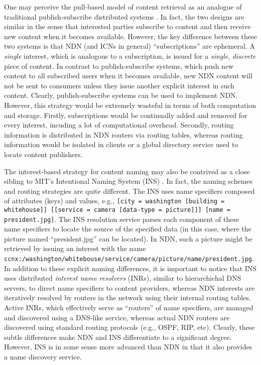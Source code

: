 One may perceive the pull-based model of content retrieval as an analogue of traditional publish-subscribe distributed systems \cite{eugster2003many}. In fact, the two designs are similar in the sense that interested parties subscribe to content and then receive new content when it becomes available. However, the key difference between these two systems is that NDN (and ICNs in general) ``subscriptions'' are ephemeral. A \emph{single} interest, which is analogous to a subscription, is issued for a \emph{single}, \emph{discrete} piece of content. In contrast to publish-subscribe systems, which push new content to all subscribed users when it becomes available, new NDN content will not be sent to consumers unless they issue another explicit interest in such content. Clearly, publish-subscribe systems can be used to implement NDN. However, this strategy would be extremely wasteful in terms of both computation and storage. Firstly, subscriptions would be continually added and removed for every interest, incuding a lot of computational overhead. Secondly, routing information is distributed in NDN routers via routing tables, whereas routing information would be isolated in clients or a global directory service used to locate content publishers. 

The interest-based strategy for content naming may also be contrived as a close sibling to MIT's Intentional Naming System (INS) \cite{INS}. In fact, the naming schemes and routing strategies are quite different. The INS uses name specifiers composed of attributes (keys) and values, e.g., {\tt [city = washington [building = whitehouse]] [[service = camera [data-type = picture]]] [name = president.jpg]}. The INS resolution service parses each component of these name specifiers to locate the source of the specified data (in this case, where the picture named ``president.jpg'' can be located). In NDN, such a picture might be retrieved by issuing an interest with the name {\tt ccnx:/washington/whitebouse/service/camera/picture/name/president.jpg}. In addition to these explicit naming differences, it is important to notice that INS uses distributed \emph{interest name resolvers} (INRs), similar to hierarchichal DNS servers, to direct name specifiers to content providers, whereas NDN interests are iteratively resolved by routers in the network using their internal routing tables. Active INRs, which effectively serve as ``routers'' of name specifiers, are managed and discovered using a DNS-like service, whereas actual NDN routers are discovered using standard routing protocols (e.g., OSPF, RIP, etc). Clearly, these subtle differences make NDN and INS differentiate to a significant degree. However, INS is in some sense more advanced than NDN in that it also provides a name discovery service. 

